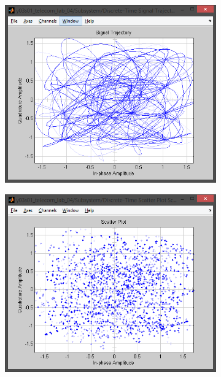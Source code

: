 \documentclass[
	a4paper,
	oneside,
	BCOR = 10mm,
	DIV = 12,
	12pt,
	headings = normal,
]{scrartcl}
\begin{document}
\begin{figure}[!htbp]
\begin{subfigure}{\textwidth / 3}
						\caption{}
						\label{subfig:rolloff-0p0-eye-out}
					\end{subfigure}%
					\begin{subfigure}{\textwidth / 3}
						\centering
						\includegraphics[height = 7\baselineskip]{../01-solution/rolloff-0p0-signal-trajectory-out.png}
						\caption{}
						\label{subfig:rolloff-0p0-signal-trajectory-out}
					\end{subfigure}%
					\begin{subfigure}{\textwidth / 3}
						\centering
						\includegraphics[height = 7\baselineskip]{../01-solution/rolloff-0p0-scatter-plot-out.png}

\end{subfigure}
\end{figure}
\end{document}
